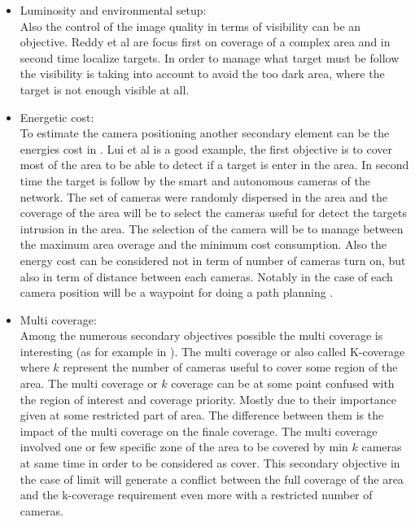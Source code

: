 \begin{itemize}
\item  Luminosity and environmental setup:\\ Also  the  control of the image quality in terms of visibility can be an objective. Reddy et al \cite{33*reddy2012} are focus first on coverage of a complex area and in second time localize targets.  In order to manage what target must be follow the visibility is taking into account to avoid the too dark area, where the target is not enough visible at all. \\

\item  Energetic cost:
\\ To estimate the camera positioning another secondary element can be the energies cost in \cite{38*liu2010,42*bulusu2001}. Lui et al \cite{38*liu2010} is a good example, the first objective is to cover most of the area to be able to detect if a target is enter in the area. In second time the target is follow by the smart and autonomous cameras of the network. The set of cameras were randomly dispersed in the area and the coverage of the area will be to select the cameras useful for detect the targets intrusion in the area. The selection of the camera will be to manage between the maximum area overage and the minimum cost consumption.  Also the energy cost can be considered not in term of number of cameras turn on, but also in term of distance between each cameras. Notably in the case of each camera position will be a waypoint for doing a path planning \cite{191*di2016,218*meiting2007}.  
\\
\item Multi coverage:\\ Among the numerous secondary objectives possible the multi coverage is interesting (as for example in \cite{149*mavrinac2013,151*zhao2013,152*wang2009,174*zhang2016,175*medhi2013}). The multi coverage or also called K-coverage where $k$ represent the number of cameras useful to cover some region of the area. The multi coverage or $k$ coverage can be at some point confused with the region of interest and coverage priority. Mostly due to their importance given at some restricted part of area. The difference between them is the impact of the multi coverage on the finale coverage. The multi coverage involved one or few specific zone of the area to be covered by min $k$ cameras at same time in order to be considered as cover. This secondary objective in the case of limit will generate a conflict between the full coverage of the area and the k-coverage requirement even more with a restricted number of cameras. 

\end{itemize}
